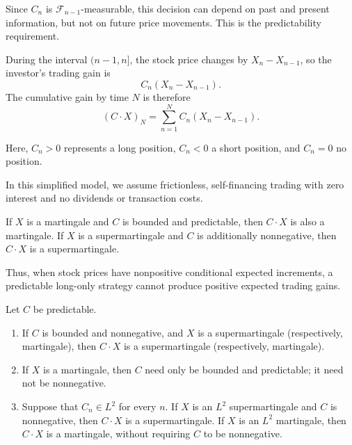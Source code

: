 Since $C_n$ is $\mathcal F_{n-1}$-measurable, this
decision can depend on past and present information,
but not on future price movements. This is the
predictability requirement.

During the interval $(n-1,n]$, the stock price changes
by $X_n-X_{n-1}$, so the investor's trading gain is
\[
    C_n(X_n-X_{n-1}).
\]
The cumulative gain by time $N$ is therefore
\[
    (C\cdot X)_N
    =\sum_{n=1}^N C_n(X_n-X_{n-1}).
\]

Here, $C_n>0$ represents a long position, $C_n<0$
a short position, and $C_n=0$ no position.

In this simplified model, we assume frictionless,
self-financing trading with zero interest and no
dividends or transaction costs.

If $X$ is a martingale and $C$ is bounded and
predictable, then $C\cdot X$ is also a martingale.
If $X$ is a supermartingale and $C$ is additionally
nonnegative, then $C\cdot X$ is a supermartingale.

Thus, when stock prices have nonpositive conditional
expected increments, a predictable long-only strategy
cannot produce positive expected trading gains.

\begin{proposition}
Let $C$ be predictable.

\begin{enumerate}
    \item[(i)] If $C$ is bounded and nonnegative, and $X$ is a
    supermartingale (respectively, martingale), then $C\cdot X$ is a
    supermartingale (respectively, martingale).

    \item[(ii)] If $X$ is a martingale, then $C$ need only be bounded
    and predictable; it need not be nonnegative.

    \item[(iii)] Suppose that $C_n\in L^2$ for every $n$. If $X$ is an
    $L^2$ supermartingale and $C$ is nonnegative, then $C\cdot X$ is a
    supermartingale. If $X$ is an $L^2$ martingale, then $C\cdot X$ is
    a martingale, without requiring $C$ to be nonnegative.
\end{enumerate}
\end{proposition}

